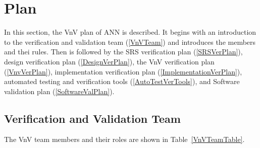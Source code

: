 \documentclass[12pt, titlepage]{article}
\begin{document}



\section{Plan}\label{Plan}

In this section, the VnV plan of ANN is described. 
It begins with an introduction to the verification and validation team (\autoref{VnVTeam}) and 
introduces the members and thei rules. 
Then is followed by the SRS verification plan (\autoref{SRSVerPlan}), 
design verification plan (\autoref{DesignVerPlan}), 
the VnV verification plan (\autoref{VnvVerPlan}), 
implementation verification plan (\autoref{ImplementationVerPlan}), 
automated testing and verification tools (\autoref{AutoTestVerTools}), and
Software validation plan (\autoref{SoftwareValPlan}).


\subsection{Verification and Validation Team}\label{VnVTeam}

The VnV team members and their roles are shown in Table~\ref{VnVTeamTable}.
\end{document}
